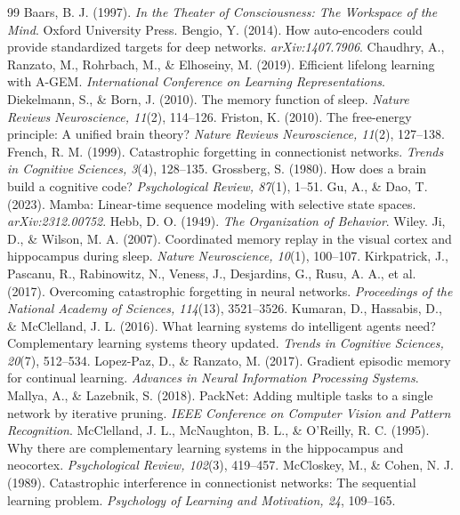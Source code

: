 \documentclass[11pt]{article}
\begin{document}
\begin{thebibliography}{99}
 Baars, B. J. (1997). \textit{In the Theater of Consciousness: The Workspace of the Mind}. Oxford University Press.
 Bengio, Y. (2014). How auto-encoders could provide standardized targets for deep networks. \textit{arXiv:1407.7906}.
 Chaudhry, A., Ranzato, M., Rohrbach, M., \& Elhoseiny, M. (2019). Efficient lifelong learning with A-GEM. \textit{International Conference on Learning Representations}.
 Diekelmann, S., \& Born, J. (2010). The memory function of sleep. \textit{Nature Reviews Neuroscience, 11}(2), 114--126.
 Friston, K. (2010). The free-energy principle: A unified brain theory? \textit{Nature Reviews Neuroscience, 11}(2), 127--138.
 French, R. M. (1999). Catastrophic forgetting in connectionist networks. \textit{Trends in Cognitive Sciences, 3}(4), 128--135.
 Grossberg, S. (1980). How does a brain build a cognitive code? \textit{Psychological Review, 87}(1), 1--51.
 Gu, A., \& Dao, T. (2023). Mamba: Linear-time sequence modeling with selective state spaces. \textit{arXiv:2312.00752}.
 Hebb, D. O. (1949). \textit{The Organization of Behavior}. Wiley.
 Ji, D., \& Wilson, M. A. (2007). Coordinated memory replay in the visual cortex and hippocampus during sleep. \textit{Nature Neuroscience, 10}(1), 100--107.
 Kirkpatrick, J., Pascanu, R., Rabinowitz, N., Veness, J., Desjardins, G., Rusu, A. A., et al. (2017). Overcoming catastrophic forgetting in neural networks. \textit{Proceedings of the National Academy of Sciences, 114}(13), 3521--3526.
 Kumaran, D., Hassabis, D., \& McClelland, J. L. (2016). What learning systems do intelligent agents need? Complementary learning systems theory updated. \textit{Trends in Cognitive Sciences, 20}(7), 512--534.
 Lopez-Paz, D., \& Ranzato, M. (2017). Gradient episodic memory for continual learning. \textit{Advances in Neural Information Processing Systems}.
 Mallya, A., \& Lazebnik, S. (2018). PackNet: Adding multiple tasks to a single network by iterative pruning. \textit{IEEE Conference on Computer Vision and Pattern Recognition}.
 McClelland, J. L., McNaughton, B. L., \& O'Reilly, R. C. (1995). Why there are complementary learning systems in the hippocampus and neocortex. \textit{Psychological Review, 102}(3), 419--457.
 McCloskey, M., \& Cohen, N. J. (1989). Catastrophic interference in connectionist networks: The sequential learning problem. \textit{Psychology of Learning and Motivation, 24}, 109--165.

\end{thebibliography}
\end{document}
